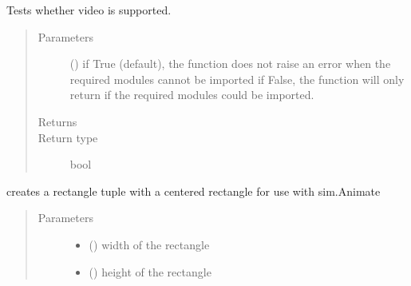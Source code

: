 \documentclass[letterpaper,10pt,english]{sphinxmanual}
\begin{document}

\begin{fulllineitems}
\label{\detokenize{Reference:salabim.can_video}}
Tests whether video is supported.
\begin{quote}\begin{description}
\item[{Parameters}] \leavevmode
{} () \textendash{} if True (default), the function does not raise an error when the required modules cannot be imported 
if False, the function will only return if the required modules could be imported.

\item[{Returns}] \leavevmode
{}

\item[{Return type}] \leavevmode
bool

\end{description}\end{quote}

\end{fulllineitems}


\begin{fulllineitems}
\label{\detokenize{Reference:salabim.centered_rectangle}}
creates a rectangle tuple with a centered rectangle for use with sim.Animate
\begin{quote}\begin{description}
\item[{Parameters}] \leavevmode\begin{itemize}
\item {} 
 () \textendash{} width of the rectangle

\item {} 
 () \textendash{} height of the rectangle

\end{itemize}

\end{description}\end{quote}

\end{fulllineitems}
\end{document}
